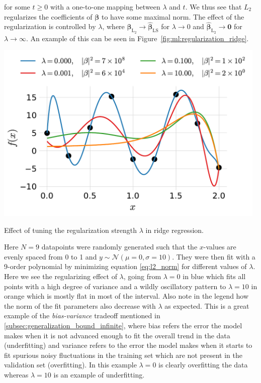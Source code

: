 \documentclass[a4paper, twoside, nobib]{tufte-book}
\renewcommand{\vec}[1]{\mathbf{#1}}
\begin{document}
for some $t \geq 0$ with a one-to-one mapping between $\lambda$ and $t$. We thus see that $L_2$ regularizes the coefficients of $\bm{\beta}$ to have some maximal norm. The effect of the regularization is controlled by $\lambda$, where $\hat{\bm{\beta}}_{\mathrm{L_2}} \rightarrow \hat{\bm{\beta}}_{\mathrm{LS}}$ for $\lambda \rightarrow 0$ and $\hat{\bm{\beta}}_{\mathrm{L_2}} \rightarrow \vec{0}$ for $\lambda \rightarrow \infty$. An example of this can be seen in Figure~\ref{fig:ml:regularization_ridge}. 
\begin{marginfigure}
  \includegraphics[width=0.98\textwidth]{figures/ridge_regression/ridge.pdf}
  \caption[Regularization Effect]
    {Effect of tuning the regularization strength $\lambda$ in ridge regression.
    }
  \label{fig:ml:regularization_ridge}
\end{marginfigure}
Here $N=9$ datapoints were randomly generated such that the $x$-values are evenly spaced from \num{0} to \num{1} and $y \sim \mathcal{N}(\mu=0, \sigma=10)$. They were then fit with a \num{9}-order polynomial by minimizing equation \eqref{eq:l2_norm} for different values of $\lambda$. Here we see the regularizing effect of $\lambda$, going from $\lambda=0$ in blue which fits all points with a high degree of variance and a wildly oscillatory pattern to $\lambda=10$ in orange which is mostly flat in most of the interval. Also note in the legend how the norm of the fit parameters also decrease with $\lambda$ as expected. This is a great example of the \emph{bias-variance} tradeoff mentioned in \autoref{subsec:generalization_bound_infinite}, where bias refers the error the model makes when it is not advanced enough to fit the overall trend in the data (underfitting) and variance refers to the error the model makes when it starts to fit spurious noisy fluctuations in the training set which are not present in the validation set (overfitting). In this example $\lambda=0$ is clearly overfitting the data whereas $\lambda=10$ is an example of underfitting. 
\end{document}
